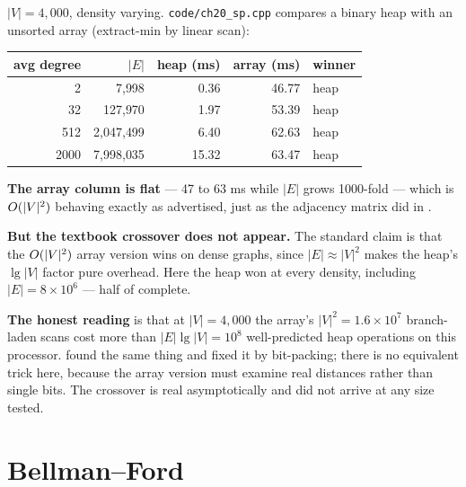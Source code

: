 \begin{worked}
$|V| = 4{,}000$, density varying. \texttt{code/ch20\_sp.cpp} compares a binary
heap with an unsorted array (extract-min by linear scan):

\begin{center}
\begin{tabular}{@{}rrrrl@{}}
\toprule
\rowcolor{primary!15}
avg degree & $|E|$ & heap (ms) & array (ms) & winner \\
\midrule
   2 &     7{,}998 &  0.36 & 46.77 & heap \\
  32 &   127{,}970 &  1.97 & 53.39 & heap \\
 512 & 2{,}047{,}499 &  6.40 & 62.63 & heap \\
2000 & 7{,}998{,}035 & 15.32 & 63.47 & heap \\
\bottomrule
\end{tabular}
\end{center}

\smallskip
\textbf{The array column is flat} --- 47 to 63 ms while $|E|$ grows 1000-fold
--- which is $O(|V|^{2})$ behaving exactly as advertised, just as the
adjacency matrix did in .

\smallskip
\textbf{But the textbook crossover does not appear.} The standard claim is that
the $O(|V|^{2})$ array version wins on dense graphs, since $|E| \approx
|V|^{2}$ makes the heap's $\lg|V|$ factor pure overhead. Here the heap won at
every density, including $|E| = 8 \times 10^{6}$ --- half of complete.

\smallskip
\textbf{The honest reading} is that at $|V| = 4{,}000$ the array's $|V|^{2} =
1.6\times10^{7}$ branch-laden scans cost more than $|E|\lg|V| = 10^{8}$
well-predicted heap operations on this processor.  found the same
thing and fixed it by bit-packing; there is no equivalent trick here, because
the array version must examine real distances rather than single bits. The
crossover is real asymptotically and did not arrive at any size tested.
\end{worked}

\section{Bellman--Ford}


